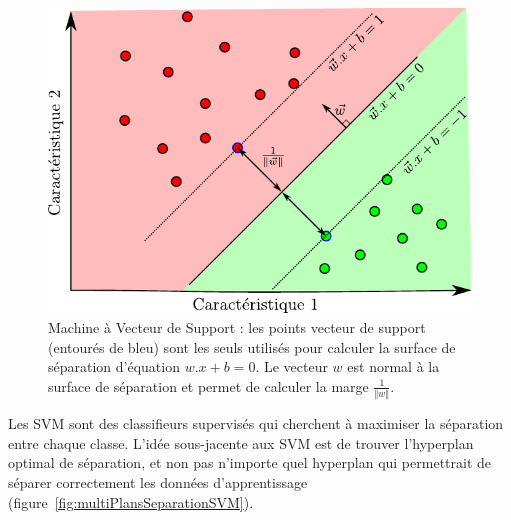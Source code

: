 \begin{figure}[h]
	\begin{center}
	\includegraphics[width=12cm]{images/SVM}
	\end{center}
	\caption[Machine à Vecteur de Support]{Machine à Vecteur de Support : les points vecteur de support (entourés de bleu) sont les seuls utilisés pour calculer la surface de séparation d'équation $w . x + b = 0$. Le vecteur $w$ est normal à la surface de séparation et permet de calculer la marge $\frac{1}{\Vert w \Vert}$.}
	\label{fig:SVM}
\end{figure}


Les SVM sont des classifieurs supervisés qui cherchent à maximiser la séparation entre chaque classe. L'idée sous-jacente aux SVM est de trouver l'hyperplan optimal de séparation, et non pas n'importe quel hyperplan qui permettrait de séparer correctement les données d'apprentissage (figure~\ref{fig:multiPlansSeparationSVM}). 


